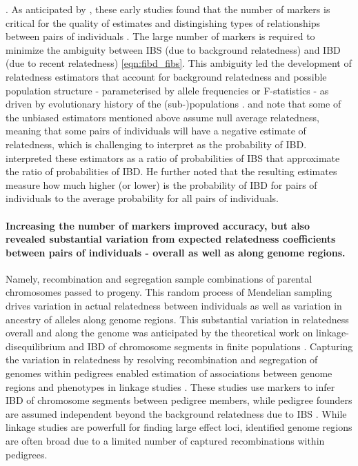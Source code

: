 \citep[e.g.][]{ritland1996estimators, milligan2003maximum, weir2006genetic}.
%
As anticipated by \cite{thompson1975estimation}, these early studies
found that the number of markers is critical for the quality of estimates
and distingishing types of relationships between pairs of individuals
\citep{weir2006genetic}.
%
The large number of markers is required to minimize the ambiguity between
IBS (due to background relatedness) and IBD (due to recent relatedness) \eqref{eqn:fibd_fibs}.
%
This ambiguity led the development of relatedness estimators
that account for background relatedness and possible population
structure - parameterised by allele frequencies or F-statistics -
as driven by evolutionary history of the (sub-)populations
\citep{balding1994dna, anderson2007maximum, wang2011unbiased}.
%
\cite{rousset2002inbreeding} and \cite{wang2014marker} note that 
some of the unbiased estimators mentioned above assume null
average relatedness, meaning that some pairs of individuals will have
a negative estimate of relatedness, which is challenging to interpret
as the probability of IBD.
%
\cite{rousset2002inbreeding} interpreted these estimators as a ratio of
probabilities of IBS that approximate the ratio of probabilities of IBD.
%
He further noted that the resulting estimates measure how much higher
(or lower) is the probability of IBD for pairs of individuals to the
average probability for all pairs of individuals.

\paragraph{Increasing the number of markers improved accuracy, but also
revealed substantial variation from expected relatedness coefficients
between pairs of individuals - overall as well as along genome regions.}
%
Namely, recombination and segregation sample combinations of parental
chromosomes passed to progeny.
%
This random process of Mendelian sampling drives variation in actual
relatedness between individuals as well as variation in ancestry of
alleles along genome regions.
%
This substantial variation in relatedness overall and along the genome
was anticipated by the theoretical work on linkage-disequilibrium and
IBD of chromosome segments in finite populations
\citep{hill1968linkage, ohta1969linkage, sved1971linkage,
stam1980distribution, donnelly1983probability}.
%
Capturing the variation in relatedness by resolving recombination and
segregation of genomes within pedigrees enabled estimation of associations
between genome regions and phenotypes in linkage studies
\citep[e.g.][]{fernando1989marker, terwilliger1994handbook,
lander1995genetic, ott2015genetic}.
%
These studies use markers to infer IBD of chromosome segments
between pedigree members, while pedigree founders are assumed independent
beyond the background relatedness due to IBS
\citep[e.g.][]{elston1971general, lander1987construction,
daywilliams2011linkage, ott2015genetic, whalen2018hybrid}.
%
While linkage studies are powerfull for finding large effect loci,
identified genome regions are often broad due to a limited number of
captured recombinations within pedigrees.

